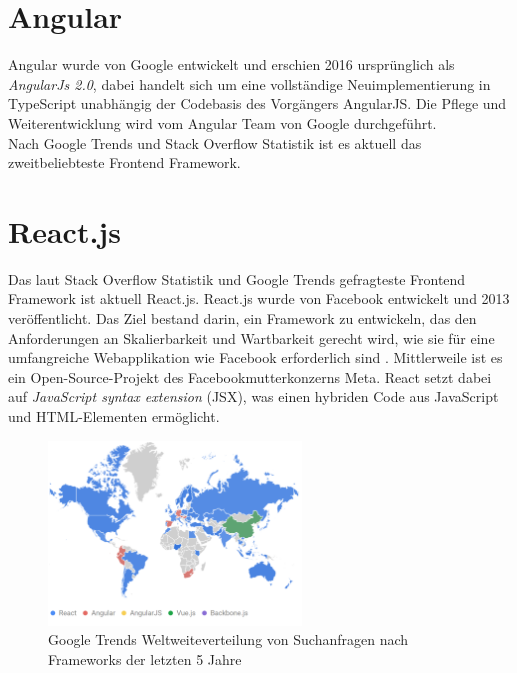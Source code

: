 \section{Angular}
Angular wurde von Google entwickelt und erschien 2016 ursprünglich als \emph{AngularJs 2.0},
dabei handelt sich um eine vollständige Neuimplementierung in TypeScript unabhängig der Codebasis des Vorgängers AngularJS.
Die Pflege und Weiterentwicklung wird vom Angular Team von Google durchgeführt. \cite[S. 209-210]{bin2019}
\\
Nach Google Trends \cite{googleTrends} und Stack Overflow Statistik  \cite{stackoverflowStats} ist es aktuell das zweitbeliebteste
Frontend Framework.

\section{React.js}
Das laut Stack Overflow Statistik \cite{stackoverflowStats} und Google Trends \cite{googleTrends} gefragteste Frontend Framework ist aktuell React.js.
React.js wurde von Facebook entwickelt und 2013 veröffentlicht.
Das Ziel bestand darin, ein Framework zu entwickeln,
das den Anforderungen an Skalierbarkeit und Wartbarkeit gerecht wird,
wie sie für eine umfangreiche Webapplikation wie Facebook erforderlich sind \cite[S. 1]{gackenheimer2015introduction}.
Mittlerweile ist es ein Open-Source-Projekt des Facebookmutterkonzerns Meta.
React setzt dabei auf \emph{JavaScript syntax extension} (JSX), was einen hybriden Code aus JavaScript und HTML-Elementen ermöglicht. \cite{react}


\begin{figure}[!htb]
    \centering
    \includegraphics[width=0.6\textwidth]{img/Google Stats/2023-04-26 12_20_26-React, Angular, AngularJS, Vue.js, Backbone.js - Erkunden - Google Trends}
    \caption{Google Trends Weltweiteverteilung von Suchanfragen nach Frameworks der letzten 5 Jahre \cite{googleTrends}}
    \label{fig:google_trends_world}
\end{figure}
